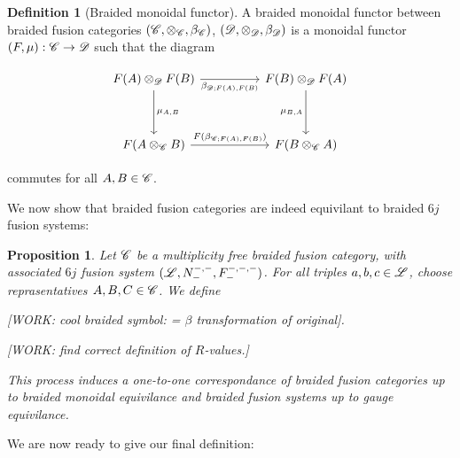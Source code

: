 \documentclass{article}
\newtheorem{proposition}{Proposition}[section]
\theoremstyle{definition}
\newtheorem*{definition}{Definition}
\numberwithin{figure}{section}
\begin{document}
\begin{definition}[Braided monoidal functor] A braided monoidal functor between braided fusion categories $(\mathscr{C},\otimes_{\mathscr{C}},\beta_{\mathscr{C}})$, $(\mathscr{D},\otimes_{\mathscr{D}},\beta_{\mathscr{D}})$ is a monoidal functor $(F,\mu):\mathscr{C}\to \mathscr{D}$ such that the diagram

\[\begin{tikzcd}
	{F(A)\otimes_{\Dcat}F(B)} && {F(B)\otimes_{\Dcat}F(A)} \\
	\\
	{F(A\otimes_{\Ccat}B)} && {F(B\otimes_{\Ccat}A)}
	\arrow["{\mu_{A,B}}", from=1-1, to=3-1]
	\arrow["{\beta_{\Dcat;F(A),F(B)}}"', from=1-1, to=1-3]
	\arrow["{\mu_{B,A}}"', from=1-3, to=3-3]
	\arrow["{F(\beta_{\Ccat;F(A),F(B)})}", from=3-1, to=3-3]
\end{tikzcd}\]

commutes for all $A,B\in \mathscr{C}$.

\raggedleft\qedsymbol{}
\end{definition}

We now show that braided fusion categories are indeed equivilant to braided $6j$ fusion systems:

\begin{proposition}\label{Make braided system} Let $\mathscr{C}$ be a multiplicity free braided fusion category, with associated $6j$ fusion system $(\mathscr{L},N^{\--,\--}_{\--},F^{\--,\--,\--}_{\--})$.  For all triples $a,b,c\in \mathscr{L}$, choose reprasentatives $A,B,C\in \mathscr{C}$. We define

[WORK: cool braided symbol: = $\beta$ transformation of original].

[WORK: find correct definition of $R$-values.]

This process induces a one-to-one correspondance of braided fusion categories up to braided monoidal equivilance and braided fusion systems up to gauge equivilance.
\end{proposition}

We are now ready to give our final definition:
\end{document}
